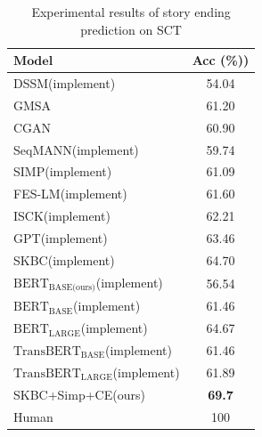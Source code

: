 \begin{table}[th]
 \small
\centering
\begin{tabular}{lc}
\hline
$\textbf{Model}$ & Acc (\%))\\
\hline
\hline
DSSM(implement)& 54.04\\
GMSA& 61.20\\
CGAN& 60.90 \\
SeqMANN(implement)& 59.74\\
SIMP(implement)&61.09\\
FES-LM(implement)&61.60\\
ISCK(implement)& 62.21 \\
GPT(implement)& 63.46\\
SKBC(implement)&64.70\\
$\text{BERT}_\text{BASE(ours)}$(implement)&56.54\\
$\text{BERT}_\text{BASE}$(implement)&61.46\\
$\text{BERT}_\text{LARGE}$(implement)&64.67\\
$\text{TransBERT}_\text{BASE}$(implement)&61.46\\
$\text{TransBERT}_\text{LARGE}$(implement)&61.89\\
\hline
SKBC+Simp+CE(ours)&\bf{69.7}\\
%
\hline
Human& 100\\
\hline
\end{tabular}
\caption{Experimental results of story ending prediction on SCT}
\label{tab:all-models}
\end{table}

